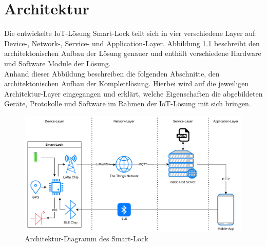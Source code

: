 
\chapter{Architektur}
Die entwickelte \ac{IoT}-Lösung Smart-Lock teilt sich in vier verschiedene Layer auf: Device-, Network-, Service- und Application-Layer. Abbildung \ref{fig:architektur} beschreibt den architektonischen Aufbau der Lösung genauer und enthält verschiedene Hardware und Software Module der Lösung. \\
Anhand dieser Abbildung beschreiben die folgenden Abschnitte, den architektonischen Aufbau der Komplettlösung. Hierbei wird auf die jeweiligen Architektur-Layer eingegangen und erklärt, welche Eigenschaften die abgebildeten Geräte, Protokolle und Software im Rahmen der \ac{IoT}-Lösung mit sich bringen.

\begin{figure}[!htbp]
    \centering
    \includegraphics[width=1\linewidth]{images/architecture_smart_lock.pdf}
    \caption[Architektur-Diagramm des Smart-Lock]{Architektur-Diagramm des Smart-Lock}
    \label{fig:architektur}
\end{figure}




